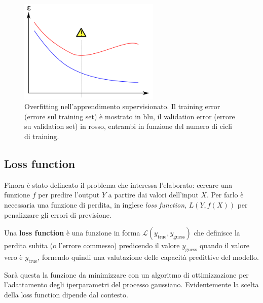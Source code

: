 \begin{figure}[htbp]
    \centering
    \includegraphics[width=0.6\textwidth]{images/Machine learning/Overfitting error.png}
    \caption{Overfitting nell'apprendimento supervisionato. Il training error (errore sul training set) è mostrato in blu, il validation error (errore su validation set) in rosso, entrambi in funzione del numero di cicli di training. \cite{wiki:overfitting}}
    \label{overfittingError}
\end{figure}


\subsection{Loss function}
Finora è stato delineato il problema che interessa l'elaborato: cercare una funzione $f$ per predire l'output $Y$ a partire dai valori dell'input $X$. Per farlo è necessaria una funzione di perdita, in inglese \textit{loss function}, $L(Y, f (X))$ per penalizzare gli errori di previsione.

\begin{defi}
Una \textbf{loss function} è una funzione in forma $\mathcal{L}(y_{\text{true}},y_{ \text{guess}})$ che definisce la perdita subita (o l'errore commesso) predicendo il valore $y_\text{guess}$ quando il valore vero è $y_{\text{true}}$,  fornendo quindi una valutazione delle capacità predittive del modello.
\end{defi}

Sarà questa la funzione da minimizzare con un algoritmo di ottimizzazione per l'adattamento degli iperparametri del processo gaussiano. Evidentemente la scelta della loss function dipende dal contesto.


